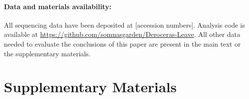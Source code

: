 \documentclass[12pt]{article}
\begin{document}
\paragraph{Data and materials availability:}
All sequencing data have been deposited at [accession numbers]. Analysis code is available at \url{https://github.com/somnasgarden/Deroceras-Leave}. All other data needed to evaluate the conclusions of this paper are present in the main text or the supplementary materials.



\newpage
\section*{Supplementary Materials}

%
\end{document}
